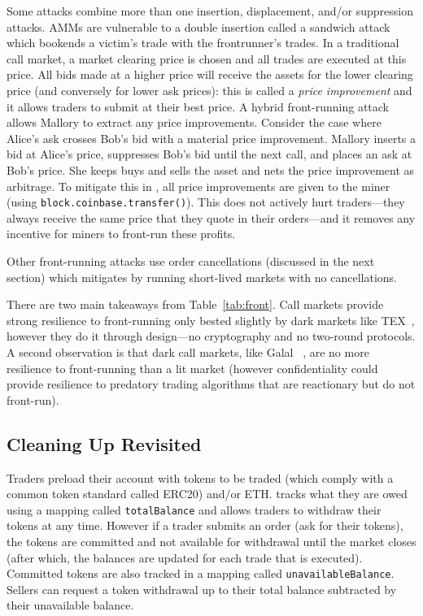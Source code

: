 Some attacks combine more than one insertion, displacement, and/or suppression attacks. AMMs are vulnerable to a double insertion called a sandwich attack~\cite{ZQFLG21} which bookends a victim's trade with the frontrunner's trades. In a traditional call market, a market clearing price is chosen and all trades are executed at this price. All bids made at a higher price will receive the assets for the lower clearing price (and conversely for lower ask prices): this is called a \textit{price improvement} and it allows traders to submit at their best price. A hybrid front-running attack allows Mallory to extract any price improvements. Consider the case where Alice's ask crosses Bob's bid with a material price improvement. Mallory inserts a bid at Alice's price, suppresses Bob's bid until the next call, and places an ask at Bob's price. She keeps buys and sells the asset and nets the price improvement as arbitrage. To mitigate this in \cm, all price improvements are given to the miner (using \texttt{block.coinbase.transfer()}). This does not actively hurt traders---they always receive the same price that they quote in their orders---and it removes any incentive for miners to front-run these profits. 

Other front-running attacks use order cancellations (discussed in the next section) which \cm mitigates by running short-lived markets with no cancellations. 

There are two main takeaways from Table~\ref{tab:front}. Call markets provide strong resilience to front-running only bested slightly by dark markets like TEX~\cite{khalil2019tex}, however they do it through design---no cryptography and no two-round protocols. A second observation is that dark call markets, like Galal \etal~\cite{}, are no more resilience to front-running than a lit market (however confidentiality could provide resilience to predatory trading algorithms that are reactionary but do not front-run).

\subsection{Cleaning Up Revisited}

 Traders preload their account with tokens to be traded (which comply with a common token standard called ERC20) and/or ETH. \cm tracks what they are owed using a mapping called \texttt{totalBalance} and allows traders to withdraw their tokens at any time. However if a trader submits an order (\ie ask for their tokens), the tokens are committed and not available for withdrawal until the market closes (after which, the balances are updated for each trade that is executed). Committed tokens are also tracked in a mapping called \texttt{unavailableBalance}. Sellers can request a token withdrawal up to their total balance subtracted by their unavailable balance.

